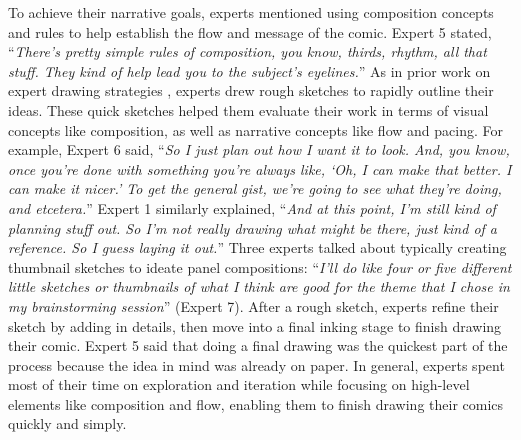 To achieve their narrative goals, experts mentioned using composition concepts and rules to help establish the flow and message of the comic. Expert 5 stated, ``\textit{There’s pretty simple rules of composition, you know, thirds, rhythm, all that stuff. They kind of help lead you to the subject’s eyelines.}'' As in prior work on expert drawing strategies \cite{Edwards1979,Poore1967}, experts drew rough sketches to rapidly outline their ideas. These quick sketches helped them evaluate their work in terms of visual concepts like composition, as well as narrative concepts like flow and pacing. For example, Expert 6 said, ``\textit{So I just plan out how I want it to look. And, you know, once you're done with something you're always like, ‘Oh, I can make that better. I can make it nicer.’ To get the general gist, we're going to see what they're doing, and etcetera.}'' Expert 1 similarly explained, ``\textit{And at this point, I'm still kind of planning stuff out. So I'm not really drawing what might be there, just kind of a reference. So I guess laying it out.}'' Three experts talked about typically creating thumbnail sketches to ideate panel compositions: ``\textit{I'll do like four or five different little sketches or thumbnails of what I think are good for the theme that I chose in my brainstorming session}'' (Expert 7). After a rough sketch, experts refine their sketch by adding in details, then move into a final inking stage to finish drawing their comic. Expert 5 said that doing a final drawing was the quickest part of the process because the idea in mind was already on paper. In general, experts spent most of their time on exploration and iteration while focusing on high-level elements like composition and flow, enabling them to finish drawing their comics quickly and simply. 

